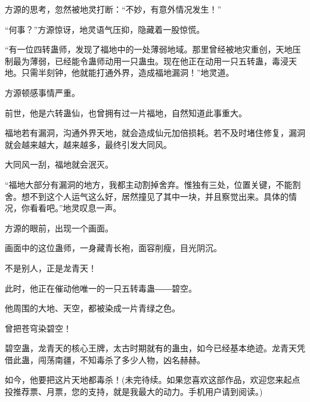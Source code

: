 \begin{this_body}
方源的思考，忽然被地灵打断：“不妙，有意外情况发生！”

“何事？”方源惊讶，地灵语气压抑，隐藏着一股惊慌。

“有一位四转蛊师，发现了福地中的一处薄弱地域。那里曾经被地灾重创，天地压制最为薄弱，已经能令蛊师动用一只蛊虫。现在他正在动用一只五转蛊，毒浸天地。只需半刻钟，他就能打通外界，造成福地漏洞！”地灵道。

方源顿感事情严重。

前世，他是六转蛊仙，也曾拥有过一片福地，自然知道此事重大。

福地若有漏洞，沟通外界天地，就会造成仙元加倍损耗。若不及时堵住修复，漏洞就会越来越大，越来越多，最终引发大同风。

大同风一刮，福地就会泯灭。

“福地大部分有漏洞的地方，我都主动割掉舍弃。惟独有三处，位置关键，不能割舍。想不到这个人运气这么好，居然撞见了其中一块，并且察觉出来。具体的情况，你看看吧。”地灵叹息一声。

方源的眼前，出现一个画面。

画面中的这位蛊师，一身藏青长袍，面容削瘦，目光阴沉。

不是别人，正是龙青天！

此时，他正在催动他唯一的一只五转毒蛊――碧空。

他周围的大地、天空，都被染成一片青绿之色。

曾把苍穹染碧空！

碧空蛊，龙青天的核心王牌，太古时期就有的蛊虫，如今已经基本绝迹。龙青天凭借此蛊，闯荡南疆，不知毒杀了多少人物，凶名赫赫。

如今，他要把这片天地都毒杀！(未完待续。如果您喜欢这部作品，欢迎您来起点投推荐票、月票，您的支持，就是我最大的动力。手机用户请到阅读。)

\end{this_body}

